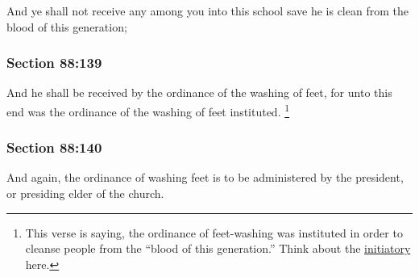 		And ye shall not receive any among you into this school save he is clean from the blood of this generation;


	\subsubsection{Section 88:139} %
		\label{DC88-139}

		And he shall be received by the ordinance of the washing of feet, for unto this end was the ordinance of the washing of feet instituted.%
			\footnote{%
				This verse is saying, the ordinance of feet-washing was instituted in order to cleanse people from the ``blood of this generation.'' Think about the \hyperref[TEMPLE-ENDOWMENT-INIT-PRE-2005]{initiatory} here.
				}


	\subsubsection{Section 88:140} %
		\label{DC88-140}

		And again, the ordinance of washing feet is to be administered by the president, or presiding elder of the church.


